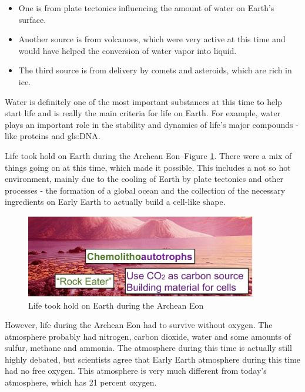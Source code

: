 \documentclass[]{article}
\begin{document}
\begin{itemize}
	\item One is from plate tectonics influencing the amount of water on Earth's surface.

	\item Another source is from volcanoes, which were very active at this time
	and would have helped the conversion of water vapor into liquid.

	\item The third source is from delivery by comets and asteroids,
	which are rich in ice.

\end{itemize}

Water is definitely one of the most
important substances
at this time to help start life
and is really the main criteria
for life on Earth.
For example,
water plays an important role
in the stability and dynamics
of life's major compounds -
like proteins and \gls{gls:DNA}.

Life took hold on Earth during the Archean Eon--Figure \ref{fig:Chemolithoautotrophs}. There were a mix of things going on
at this time,
which made it possible.
This includes a not so hot environment,
mainly due to the cooling of Earth
by plate tectonics and other processes -
the formation of a global ocean
and the collection of the necessary
ingredients on Early Earth
to actually build a cell-like shape.
\begin{figure}[H]
	\caption{Life took hold on Earth during the Archean Eon} \label{fig:Chemolithoautotrophs}
	\includegraphics[width=0.9\textwidth]{Chemolithoautotrophs}
\end{figure}



However, life during the Archean Eon
had to survive without oxygen.
The atmosphere probably had nitrogen,
carbon dioxide, water
and some amounts of sulfur,
methane and ammonia.
The atmosphere during this time
is actually still highly debated,
but scientists agree
that Early Earth atmosphere
during this time had no free oxygen.
This atmosphere is very much different
from today's atmosphere,
which has 21 percent oxygen.
\end{document}
